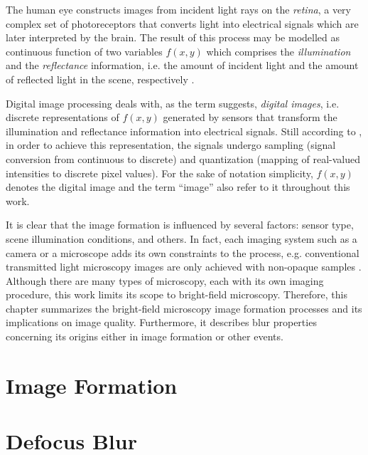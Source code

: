 


The human eye constructs images from incident light rays on the \emph{retina}, a very complex set of photoreceptors that converts light into electrical signals which are later interpreted by the brain. The result of this process may be modelled as continuous function of two variables $f(x,y)$ which comprises the \emph{illumination} and the \emph{reflectance} information, i.e. the amount of incident light and the amount of reflected light in the scene, respectively \cite{gonzalez2018digital}.

Digital image processing deals with, as the term suggests, \emph{digital images}, i.e. discrete representations of $f(x,y)$ generated by sensors that transform the illumination and reflectance information into electrical signals. Still according to , in order to achieve this representation, the signals undergo sampling (signal conversion from continuous to discrete) and quantization (mapping of real-valued intensities to discrete pixel values). For the sake of notation simplicity, $f(x,y)$ denotes the digital image and the term ``image'' also refer to it throughout this work.

It is clear that the image formation is influenced by several factors: sensor type, scene illumination conditions, and others. In fact, each imaging system such as a camera or a microscope adds its own constraints to the process, e.g. conventional transmitted light microscopy images are only achieved with non-opaque samples \cite{rudi2020contrast}. Although there are many types of microscopy, each with its own imaging procedure, this work limits its scope to bright-field microscopy. Therefore, this chapter summarizes the bright-field microscopy image formation processes and its implications on image quality. Furthermore, it describes blur properties concerning its origins either in image formation or other events. 

\section{Image Formation}


\section{Defocus Blur}

